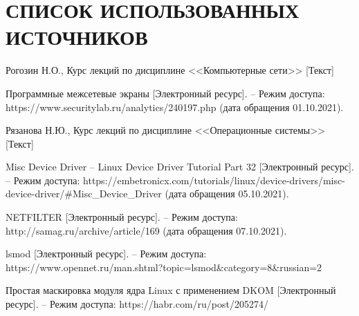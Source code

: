 \section*{СПИСОК ИСПОЛЬЗОВАННЫХ ИСТОЧНИКОВ}

\begin{thebibliography}{9}
	 Рогозин Н.О., Курс лекций по дисциплине <<Компьютерные сети>> [Текст]
	
	 Программные межсетевые экраны [Электронный ресурс]. -- Режим доступа: https://www.securitylab.ru/analytics/240197.php (дата обращения 01.10.2021).
	
	 Рязанова Н.Ю., Курс лекций по дисциплине <<Операционные системы>> [Текст]
	
	 Misc Device Driver -- Linux Device Driver Tutorial Part 32 [Электронный ресурс]. --  Режим доступа: https://embetronicx.com/tutorials/linux/device-drivers/misc-device-driver/\#Misc\_Device\_Driver (дата обращения 05.10.2021).
	
	 NETFILTER [Электронный ресурс]. -- Режим доступа: http://samag.ru/archive/article/169 (дата обращения 07.10.2021).
	
	 lsmod [Электронный ресурс]. -- Режим доступа: https://www.opennet.ru/man.shtml?topic=lsmod\&category=8\&russian=2
	
	 Простая маскировка модуля ядра Linux с применением DKOM [Электронный ресурс]. -- Режим доступа: https://habr.com/ru/post/205274/
	
\end{thebibliography}
		
		
